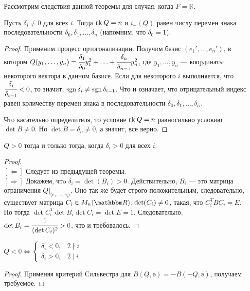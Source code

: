 Рассмотрим следствия данной теоремы для случая, когда $F = \mathbb{R}$.
\begin{Theorem}[Якоби]
	Пусть $\delta_i \neq 0$ для всех $i$. Тогда $\mathrm{rk}\: Q = n$ и $i_{-}(Q)$ равен числу перемен знака последовательности $\delta_0, \delta_1, \ldots, \delta_n$ (напомним, что $\delta_0 = 1$).
\end{Theorem}
\begin{proof}
	Применим процесс ортогонализации. Получим базис $(e_1', \ldots, e_n')$, в котором $ Q(y_1, \ldots, y_n) = \cfrac{\delta_1}{\delta_0}y_1^2 +\ldots + \cfrac{\delta_n}{\delta_{n-1}}y_n^2$, где $y_1, \ldots, y_n$ --- координаты некоторого вектора в данном базисе. Если для некоторого $i$ выполняется, что $\cfrac{\delta_i}{\delta_{i-1}} < 0$, то значит, $\operatorname{\mathop{sgn}} \delta_i \neq \operatorname{\mathop{sgn}} \delta_{i - 1}$. Что и означает, что отрицательный индекс равен количеству перемен знака в последовательности $\delta_0, \delta_1, \ldots, \delta_n$.
	
	Что касательно определителя, то условие  $\mathrm{rk}\: Q = n$ равносильно условию $\det B \neq 0$. Но $\det B = \delta_n \neq 0$, а значит, все верно.
\end{proof}
\begin{Theorem}
	$Q > 0$ тогда и только тогда, когда $\delta_i > 0$  для всех $i$.
\end{Theorem}
\begin{proof}\ \\
	$[\Leftarrow]$ Следует из предыдущей теоремы. \\
	$[\Rightarrow]$ Докажем, чтo $\delta_i = \det(B_i) > 0$. Действительно, $B_i$ --- это матрица ограничения $Q\bigr|_{\langle e_1, \ldots, e_i\rangle}$. Оно так же будет строго положительным, следовательно,  существует матрица $C_i \in M_n(\mathbb{R}),\\ \det(C_i)\neq 0$, такая, что $C_i^TBC_i = E$. Но тогда
	$\det C^T_i\det B_i \det C_i = \det E = 1$. Следовательно, $\det B_i = \cfrac{1}{(\det C_i)^2} > 0$, что и требовалось.
\end{proof}
\begin{Theorem}
	 $Q < 0 \Leftrightarrow \begin{cases}
		\delta_i < 0, & 2 \nmid i \\
		\delta_i > 0, & 2 \mid i
	\end{cases}$
\end{Theorem}
\begin{proof}
	Применяя критерий Сильвестра для $B(Q, \mathbb{e}) = - B(-Q, \mathbb{e})$, получаем требуемое.
\end{proof}

